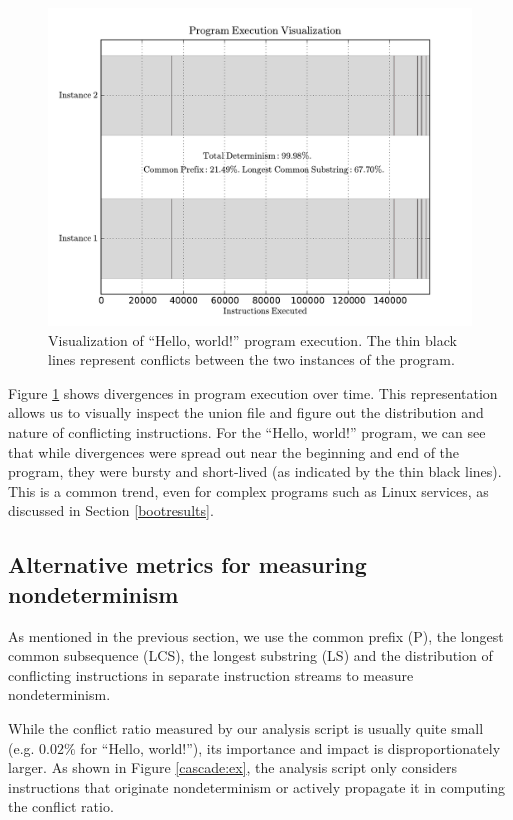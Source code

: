 \begin{figure}[h]
  \center
  \includegraphics[scale=0.55, trim=0cm 0cm 0cm 0cm]{trace.pdf}
  \caption[Visualization of ``Hello, world!'' program execution]%
          {Visualization of ``Hello, world!'' program execution.
          The thin black lines represent conflicts between
          the two instances of the program.}
  \label{hw:trace}
\end{figure} 

Figure \ref{hw:trace} shows divergences in program execution
over time. This representation allows
us to visually inspect the union file 
and figure out the distribution and nature of conflicting
instructions. For the ``Hello, world!'' program,
we can see that while divergences were 
spread out near the beginning and end of the program,
they were bursty and short-lived (as indicated
by the thin black lines). This is a common trend, 
even for complex programs such as Linux services,
as discussed in Section \ref{bootresults}.

\subsection{Alternative metrics for measuring nondeterminism} \label{alt:stats}
As mentioned in the previous section, we use the 
common prefix (P), the longest common subsequence (LCS),
the longest substring (LS) and the distribution of
conflicting instructions in separate instruction
streams to measure nondeterminism.

While the conflict ratio measured by our analysis script is usually quite small (e.g. $0.02\%$
for ``Hello, world!''), its importance and impact is disproportionately larger.
As shown in Figure \ref{cascade:ex},  the analysis script 
only considers instructions that originate nondeterminism or actively
propagate it in computing the conflict ratio. 

